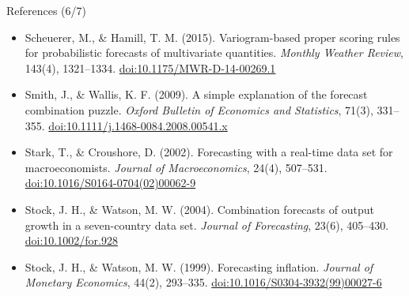 \begin{frame}{References (6/7)}
\begin{itemize}
    \item Scheuerer, M., \& Hamill, T. M. (2015). Variogram-based proper scoring rules for probabilistic forecasts of multivariate quantities. \textit{Monthly Weather Review}, 143(4), 1321--1334. \href{https://doi.org/10.1175/MWR-D-14-00269.1}{doi:10.1175/MWR-D-14-00269.1}
    \item Smith, J., \& Wallis, K. F. (2009). A simple explanation of the forecast combination puzzle. \textit{Oxford Bulletin of Economics and Statistics}, 71(3), 331--355. \href{https://doi.org/10.1111/j.1468-0084.2008.00541.x}{doi:10.1111/j.1468-0084.2008.00541.x}
    \item Stark, T., \& Croushore, D. (2002). Forecasting with a real-time data set for macroeconomists. \textit{Journal of Macroeconomics}, 24(4), 507--531. \href{https://doi.org/10.1016/S0164-0704(02)00062-9}{doi:10.1016/S0164-0704(02)00062-9}
    \item Stock, J. H., \& Watson, M. W. (2004). Combination forecasts of output growth in a seven-country data set. \textit{Journal of Forecasting}, 23(6), 405--430. \href{https://doi.org/10.1002/for.928}{doi:10.1002/for.928}
    \item Stock, J. H., \& Watson, M. W. (1999). Forecasting inflation. \textit{Journal of Monetary Economics}, 44(2), 293--335. \href{https://doi.org/10.1016/S0304-3932(99)00027-6}{doi:10.1016/S0304-3932(99)00027-6}
\end{itemize}
\end{frame}

